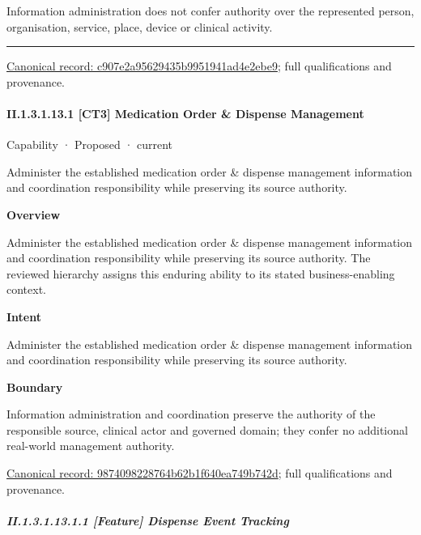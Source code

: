 Information administration does not confer authority over the represented person, organisation, service, place, device or clinical activity.



\medskip\hrule\medskip

{\footnotesize \href{../../../../continuum/strategy/capability/c907e2a95629435b9951941ad4e2ebe9.md}{Canonical record: c907e2a95629435b9951941ad4e2ebe9}; full qualifications and provenance.}\par
\paragraph*{II.1.3.1.13.1 [CT3] Medication Order \& Dispense Management}
\label{navigation:II.1.3.1.13.1}

\label{element:9874098228764b62b1f640ea749b742d}
{\small Capability · Proposed · current}\par

Administer the established medication order \& dispense management information and coordination responsibility while preserving its source authority.



\textbf{Overview}



Administer the established medication order \& dispense management information and coordination responsibility while preserving its source authority. The reviewed hierarchy assigns this enduring ability to its stated business-enabling context.



\textbf{Intent}



Administer the established medication order \& dispense management information and coordination responsibility while preserving its source authority.



\textbf{Boundary}



Information administration and coordination preserve the authority of the responsible source, clinical actor and governed domain; they confer no additional real-world management authority.


{\footnotesize \href{../../../../continuum/strategy/capability/9874098228764b62b1f640ea749b742d.md}{Canonical record: 9874098228764b62b1f640ea749b742d}; full qualifications and provenance.}\par
\subparagraph*{II.1.3.1.13.1.1 [Feature] Dispense Event Tracking}
\label{navigation:II.1.3.1.13.1.1}

